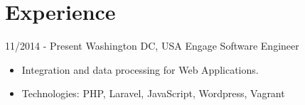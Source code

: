 \documentclass{markusos-cv}
\begin{document}

\section{Experience}

\begin{entrylist}
\entry
{11/2014 - Present}
{Washington DC, USA}
{Engage}
{Software Engineer} 
{
\begin{itemize}
\item Integration and data processing for Web Applications.
\item Technologies: PHP, Laravel, JavaScript, Wordpress, Vagrant 
\end{itemize}
}
\\%


\end{entrylist}
\end{document}
